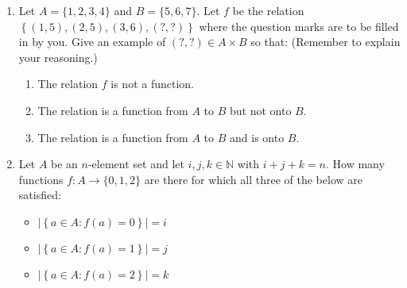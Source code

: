 \documentclass{article}
\theoremstyle{definition}
\begin{document}
\begin{question}
    \begin{enumerate}
        \item Let $A = \{1,2,3,4\}$ and $B = \{5,6,7\}$.
        Let $f$ be the relation $ \left\{(1,5),(2,5),(3,6),(?,?)\right\} $ where the question marks are to be filled in by you. 
        Give an example of $(?,?) \in A \times B$ so that: (Remember to explain your reasoning.)
            \begin{enumerate}
                \item The relation $f$ is not a function.
                \item The relation is a function from $A$ to $B$ but not onto $B$.
                \item The relation is a function from $A$ to $B$ and is onto $B$.
            \end{enumerate}

        \item     Let $A$ be an $n$-element set and let $i, j, k \in \mathbb{N}$ with $i+j+k = n$.
        How many functions $f \colon A \to \{0,1,2\}$ are there for which all three of the below are satisfied:
            \begin{itemize}
                \item $\left|\left\{ a \in A : f(a) = 0 \right\} \right| = i$
                \item $\left|\left\{ a \in A : f(a) = 1 \right\} \right| = j$
                \item $\left|\left\{ a \in A : f(a) = 2 \right\} \right| = k$
            \end{itemize}
    \end{enumerate}
\end{question}
\end{document}
